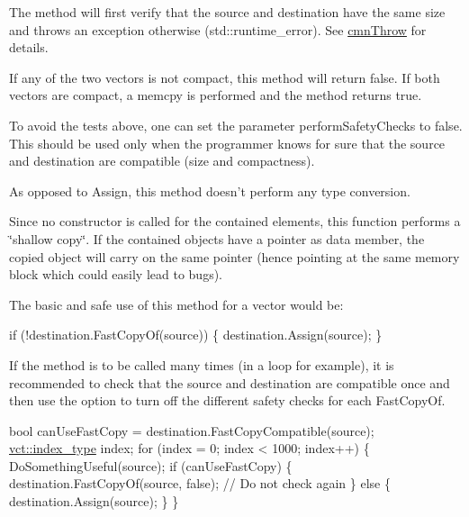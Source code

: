 \begin{DoxyItemize}
\item The method will first verify that the source and destination have the same size and throws an exception otherwise ({\ttfamily std\-::runtime\-\_\-error}). See \hyperlink{cmn_throw_8h_a6fe29a0b6f112fe0032896bb904f8377}{cmn\-Throw} for details.
\item If any of the two vectors is not compact, this method will return {\ttfamily false}. If both vectors are compact, a {\ttfamily memcpy} is performed and the method returns {\ttfamily true}.
\item To avoid the tests above, one can set the parameter {\ttfamily perform\-Safety\-Checks} to {\ttfamily false}. This should be used only when the programmer knows for sure that the source and destination are compatible (size and compactness).
\item As opposed to Assign, this method doesn't perform any type conversion.
\item Since no constructor is called for the contained elements, this function performs a \char`\"{}shallow copy\char`\"{}. If the contained objects have a pointer as data member, the copied object will carry on the same pointer (hence pointing at the same memory block which could easily lead to bugs).
\end{DoxyItemize}

The basic and safe use of this method for a vector would be\-: 
\begin{DoxyCode}
\textcolor{keywordflow}{if} (!destination.FastCopyOf(source)) \{
    destination.Assign(source);
\}
\end{DoxyCode}


If the method is to be called many times (in a loop for example), it is recommended to check that the source and destination are compatible once and then use the option to turn off the different safety checks for each Fast\-Copy\-Of. 
\begin{DoxyCode}
\textcolor{keywordtype}{bool} canUseFastCopy = destination.FastCopyCompatible(source);
\hyperlink{namespacevct_a50405d87494dce1f22ee3930ca285ee9}{vct::index\_type} index;
\textcolor{keywordflow}{for} (index = 0; index < 1000; index++) \{
    DoSomethingUseful(source);
    \textcolor{keywordflow}{if} (canUseFastCopy) \{
        destination.FastCopyOf(source, \textcolor{keyword}{false}); \textcolor{comment}{// Do not check again}
    \} \textcolor{keywordflow}{else} \{
        destination.Assign(source);
    \}
\}
\end{DoxyCode}



